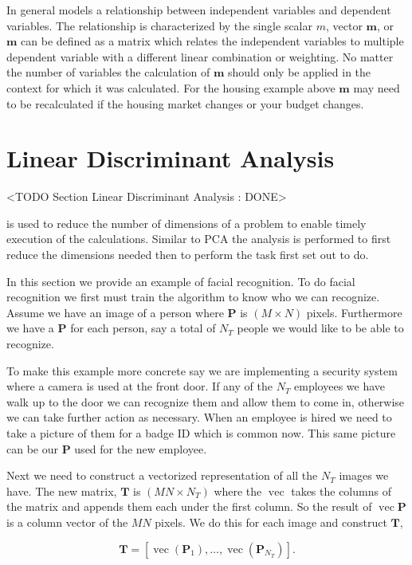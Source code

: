 In general  models a relationship between independent variables and dependent variables. The relationship is characterized by the single scalar $m$, vector $\mathbf{m}$, or $\mathbf{m}$ can be defined as a matrix which relates the independent variables to multiple dependent variable with a different linear combination or weighting. No matter the number of variables the calculation of $\mathbf{m}$ should only be applied in the context for which it was calculated. For the housing example above $\mathbf{m}$ may need to be recalculated if the housing market changes or your budget changes. 


\section{Linear Discriminant Analysis}
	<TODO Section Linear Discriminant Analysis : DONE>

 is used to reduce the number of dimensions of a problem to enable timely execution of the calculations. Similar to \ac{PCA} the analysis is performed to first reduce the dimensions needed then to perform the task first set out to do. 

In this section we provide an example of facial recognition. To do facial recognition we first must train the algorithm to know who we can recognize. Assume we have an image of a person where $\mathbf{P}$ is $(M\times N)$ pixels. Furthermore we have a $\mathbf{P}$ for each person, say a total of $N_T$ people we would like to be able to recognize. 

To make this example more concrete say we are implementing a security system where a camera is used at the front door. If any of the $N_T$ employees we have walk up to the door we can recognize them and allow them to come in, otherwise we can take further action as necessary. When an employee is hired we need to take a picture of them for a badge \ac{ID} which is common now. This same picture can be our $\mathbf{P}$ used for the new employee. 

Next we need to construct a vectorized representation of all the $N_T$ images we have. The new matrix, $\mathbf{T}$ is $(MN\times N_T)$ where the $\operatorname{vec}$ takes the columns of the matrix and appends them each under the first column. So the result of $\operatorname{vec}{\mathbf{P}}$ is a column vector of the $MN$ pixels. We do this for each image and construct $\mathbf{T}$,
	
\begin{equation}
\mathbf{T} = \left[\operatorname{vec}(\mathbf{P}_1),\dots,\operatorname{vec}(\mathbf{P}_{N_T})\right].
\end{equation}	
	
